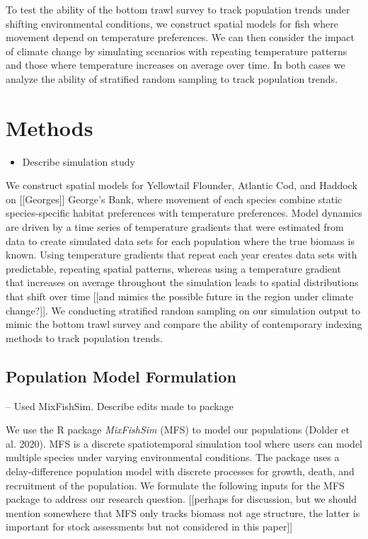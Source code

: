\documentclass[
  12pt,
]{article}
\providecommand{\tightlist}{%
  \setlength{\itemsep}{0pt}\setlength{\parskip}{0pt}}
\begin{document}
To test the ability of the bottom trawl survey to track population trends under shifting environmental conditions, we construct spatial models for fish where movement depend on temperature preferences. We can then consider the impact of climate change by simulating scenarios with repeating temperature patterns and those where temperature increases on average over time. In both cases we analyze the ability of stratified random sampling to track population trends.

\section{Methods}

\begin{itemize}
\tightlist
\item
  Describe simulation study
\end{itemize}

We construct spatial models for Yellowtail Flounder, Atlantic Cod, and Haddock on {[}{[}Georges{]}{]} George's Bank, where movement of each species combine static species-specific habitat preferences with temperature preferences. Model dynamics are driven by a time series of temperature gradients that were estimated from data to create simulated data sets for each population where the true biomass is known. Using temperature gradients that repeat each year creates data sets with predictable, repeating spatial patterns, whereas using a temperature gradient that increases on average throughout the simulation leads to spatial distributions that shift over time {[}{[}and mimics the possible future in the region under climate change?{]}{]}. We conducting stratified random sampling on our simulation output to mimic the bottom trawl survey and compare the ability of contemporary indexing methods to track population trends.

\subsection{Population Model Formulation}

-- Used MixFishSim. Describe edits made to package

We use the R package \emph{MixFishSim} (MFS) to model our populations (Dolder et al. 2020). MFS is a discrete spatiotemporal simulation tool where users can model multiple species under varying environmental conditions. The package uses a delay-difference population model with discrete processes for growth, death, and recruitment of the population. We formulate the following inputs for the MFS package to address our research question. {[}{[}perhaps for discussion, but we should mention somewhere that MFS only tracks biomass not age structure, the latter is important for stock assessments but not considered in this paper{]}{]}
\end{document}
